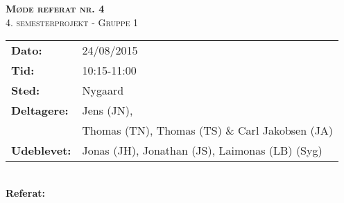 
\newcommand{\HRule}{\rule{\linewidth}{0.1mm}}


	\begin{center}
		{\huge \bfseries \textsc{Møde referat nr. 4}}\\
		\textsc{\large 4. semesterprojekt - Gruppe 1}\\[0.3cm]
	\end{center}
	\begin{tabular}{ll}
	\large \textbf{Dato:} & 24/08/2015  \\ %
	\large \textbf{Tid:}  & 10:15-11:00 \\ %
	\large \textbf{Sted:} & Nygaard		\\ %
	\large \textbf{Deltagere:} & Jens (JN),  \\
	\large \textbf & Thomas (TN),  Thomas (TS) \& Carl Jakobsen (JA)\\
	\large \textbf{Udeblevet:} & Jonas (JH), Jonathan (JS), Laimonas (LB) (Syg)	\\
	\end{tabular}\\
	\phantom{\,}\hspace{0.1em} \large \textbf{Referat:}
